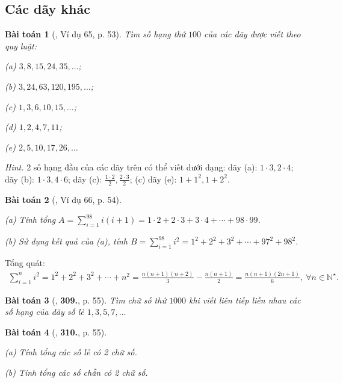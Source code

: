 \documentclass{article}
\numberwithin{equation}{section}
\newtheorem{baitoan}{Bài toán}
\begin{document}
\subsection{Các dãy khác}

\begin{baitoan}[\cite{Binh_Toan_6_tap_1}, Ví dụ 65, p. 53]
	Tìm số hạng thứ $100$ của các dãy được viết theo quy luật:
	\begin{enumerate*}
		\item[(a)] $3,8,15,24,35,\ldots$;
		\item[(b)] $3,24,63,120,195,\ldots$;
		\item[(c)] $1,3,6,10,15,\ldots$;
		\item[(d)] $1,2,4,7,11$;
		\item[(e)] $2,5,10,17,26,\ldots$
	\end{enumerate*}
\end{baitoan}
\noindent\textit{Hint.} 2 số hạng đầu của các dãy trên có thể viết dưới dạng: dãy (a): $1\cdot3,2\cdot4$; dãy (b): $1\cdot3,4\cdot6$; dãy (c): $\frac{1\cdot2}{2},\frac{2\cdot3}{2}$; (c) dãy (e): $1 + 1^2,1 + 2^2$.

\begin{baitoan}[\cite{Binh_Toan_6_tap_1}, Ví dụ 66, p. 54]
	\begin{enumerate*}
		\item[(a)] Tính tổng $A = \sum_{i=1}^{98} i(i + 1) = 1\cdot2 + 2\cdot3 + 3\cdot4 + \cdots + 98\cdot99$.
		\item[(b)] Sử dụng kết quả của (a), tính $B = \sum_{i=1}^{98} i^2 = 1^2 + 2^2 + 3^2 + \cdots + 97^2 + 98^2$.
	\end{enumerate*}
\end{baitoan}
Tổng quát:
\begin{align*}
	\sum_{i=1}^n i^2 = 1^2 + 2^2 + 3^2 + \cdots + n^2 = \frac{n(n + 1)(n + 2)}{3} - \frac{n(n + 1)}{2} = \frac{n(n + 1)(2n + 1)}{6},\ \forall n\in\mathbb{N}^\star.
\end{align*}

\begin{baitoan}[\cite{Binh_Toan_6_tap_1}, \textbf{309.}, p. 55]
	Tìm chữ số thứ $1000$ khi viết liên tiếp liền nhau các số hạng của dãy số lẻ $1,3,5,7,\ldots$
\end{baitoan}

\begin{baitoan}[\cite{Binh_Toan_6_tap_1}, \textbf{310.}, p. 55]
	\begin{enumerate*}
		\item[(a)] Tính tổng các số lẻ có 2 chữ số.
		\item[(b)] Tính tổng các số chẵn có 2 chữ số.
	\end{enumerate*}
\end{baitoan}
\end{document}
